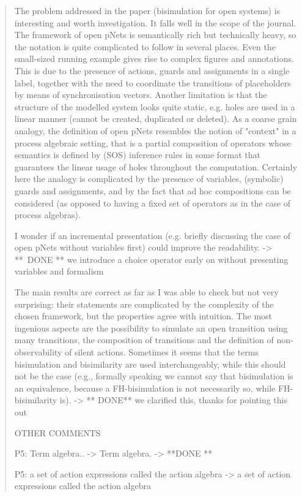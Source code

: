 \documentclass[10pt]{article}
\newenvironment{review}{\bgroup\itshape\begin{quote}}{\end{quote}\egroup}
\begin{document}
\begin{review}
The problem addressed in the paper (bisimulation for open systems) is interesting
and worth investigation. It falls well in the scope of the journal.
The framework of open pNets is semantically rich but technically heavy, so the notation is quite complicated to follow
in several places. Even the small-sized running example gives rise to complex figures and annotations.
This is due to the presence of actions, guards and assignments in a single label, together with the
need to coordinate the transitions of placeholders by means of synchronisation vectors.
Another limitation is that the structure of the modelled system looks quite static, e.g. holes are used
in a linear manner (cannot be created, duplicated or deleted).
As a coarse grain analogy, the definition of open pNets resembles the notion of "context" in a process
algebraic setting, that is a partial composition of operators whose semantics is defined by (SOS) inference
rules in some format that guarantees the linear usage of holes throughout the computation.
Certainly here the analogy is complicated by the presence of variables, (symbolic) guards and assignments,
and by the fact that ad hoc compositions can be considered (as opposed to having a fixed set of operators
as in the case of process algebras).

I wonder if an incremental presentation (e.g. briefly discussing the case of open pNets without variables first)
could improve the readability.
-> **~DONE ** we introduce a choice operator early on without presenting variables and formalism

The main results are correct as far as I was able to check but not very surprising: their statements are
complicated by the complexity of the chosen framework, but the properties agree with intuition.
The most ingenious aspects are the possibility to simulate an open transition using many transitions,
the composition of transitions and the definition of non-observability of silent actions.
Sometimes it seems that the terms bisimulation and bisimilarity are used interchangeably, while
this should not be the case (e.g., formally speaking we cannot say that bisimulation is an equivalence,
because a FH-bisimulation is not necessarily so, while FH-bisimilarity is).
-> ** DONE** we clarified this, thanks for pointing this out

OTHER COMMENTS

P5: Term algebra.. -> Term algebra.
-> **DONE **

P5: a set of action expressions  called the action algebra -> a set of action expressions called the action algebra


\end{review}
\end{document}
